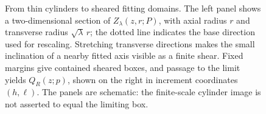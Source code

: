 \begin{figure}[tbp]
\caption{From thin cylinders to sheared fitting domains. The left panel
 shows a two-dimensional section of $Z_\lambda(z,r;P)$, with axial radius
 $r$ and transverse radius $\sqrt\lambda\,r$; the dotted line indicates the
 base direction used for rescaling. Stretching transverse directions makes
 the small inclination of a nearby fitted axis visible as a finite shear.
 Fixed margins give contained sheared boxes, and passage to the limit
 yields $Q_R(z;p)$, shown on the right in increment coordinates $(h,\ell)$.
 The panels are schematic: the finite-scale cylinder image is not asserted
 to equal the limiting box.}
\label{fig:anisotropic-fit}
\end{figure}

